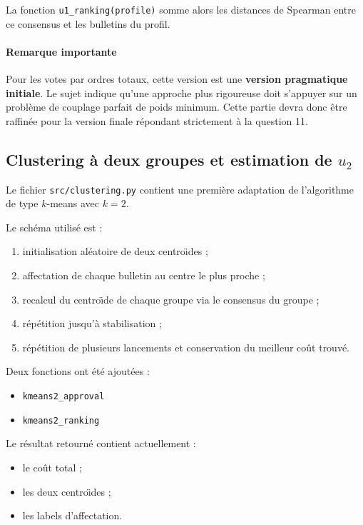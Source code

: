\documentclass[11pt,a4paper]{article}
\begin{document}
La fonction \texttt{u1\_ranking(profile)} somme alors les distances de Spearman entre ce consensus et les bulletins du profil.

\paragraph{Remarque importante}
Pour les votes par ordres totaux, cette version est une \textbf{version pragmatique initiale}. Le sujet indique qu'une approche plus rigoureuse doit s'appuyer sur un probl\`eme de couplage parfait de poids minimum. Cette partie devra donc \^etre raffin\'ee pour la version finale r\'epondant strictement \`a la question 11.

\subsection{Clustering \`a deux groupes et estimation de \texorpdfstring{$u_2$}{u2}}

Le fichier \texttt{src/clustering.py} contient une premi\`ere adaptation de l'algorithme de type \(k\)-means avec \(k=2\).

Le sch\'ema utilis\'e est :
\begin{enumerate}[leftmargin=*]
    \item initialisation al\'eatoire de deux centro\"\i des ;
    \item affectation de chaque bulletin au centre le plus proche ;
    \item recalcul du centro\"\i de de chaque groupe via le consensus du groupe ;
    \item r\'ep\'etition jusqu'\`a stabilisation ;
    \item r\'ep\'etition de plusieurs lancements et conservation du meilleur co\^ut trouv\'e.
\end{enumerate}

Deux fonctions ont \'et\'e ajout\'ees :
\begin{itemize}[leftmargin=*]
    \item \texttt{kmeans2\_approval}
    \item \texttt{kmeans2\_ranking}
\end{itemize}

Le r\'esultat retourn\'e contient actuellement :
\begin{itemize}[leftmargin=*]
    \item le co\^ut total ;
    \item les deux centro\"\i des ;
    \item les labels d'affectation.
\end{itemize}
\end{document}
